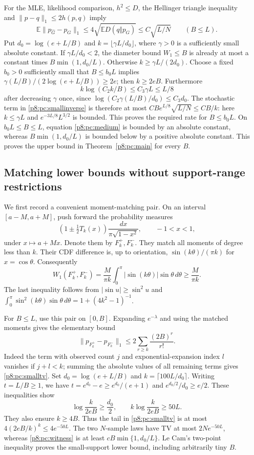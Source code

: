 \documentclass[11pt,a4paper]{article}
\theoremstyle{definition}
\theoremstyle{remark}
\numberwithin{equation}{section}
\begin{document}
For the MLE, likelihood comparison, $h^2\le D$, the Hellinger
triangle inequality and $\|p-q\|_1\le2h(p,q)$ imply
\[
 \mathbb E\|p_{\widehat G}-p_G\|_1
              \le4\sqrt{\mathbb E D(q\Vert p_G)}
              \le C\sqrt{L/N}\qquad(B\le L).
\]
Put $d_0=\log(e+L/B)$ and $k=\lfloor\gamma L/d_0\rfloor$,
where $\gamma>0$ is a sufficiently small absolute constant.
If $\gamma L/d_0<2$, the diameter bound $W_1\le B$ is already at
most a constant times $B\min(1,d_0/L)$.  Otherwise
$k\ge\gamma L/(2d_0)$.  Choose a fixed $b_0>0$ sufficiently small
that $B\le b_0L$ implies
$\gamma(L/B)/(2\log(e+L/B))\ge2e$; then $k\ge2eB$.
Furthermore
\[
 k\log(C_2k/B)\le C_3\gamma L\le L/8
\]
after decreasing $\gamma$ once, since
$\log(C_2\gamma(L/B)/d_0)\le C_3d_0$.
The stochastic term in \eqref{p8:pc:smallinverse} is therefore at most
$CB e^{L/8}\sqrt{L/N}\le CB/k$: here $k\le\gamma L$ and
$e^{-3L/8}L^{3/2}$ is bounded.  This proves the required rate for
$B\le b_0L$.  On $b_0L\le B\le L$, equation \eqref{p8:pc:medium}
is bounded by an absolute constant, whereas
$B\min(1,d_0/L)$ is bounded below by a positive absolute constant.
This proves the upper bound in Theorem~\ref{p8:pc:main} for every $B$.

\subsection{Matching lower bounds without support-range restrictions}

We first record a convenient moment-matching pair.  On an interval
$[a-M,a+M]$, push forward the probability measures
\[
 (1\pm\tfrac12T_k(x))\frac{dx}{\pi\sqrt{1-x^2}},\qquad -1<x<1,
\]
under $x\mapsto a+Mx$.  Denote them by $F_k^+,F_k^-$.
They match all moments of degree less than $k$.  Their CDF difference
is, up to orientation, $\sin(k\theta)/(\pi k)$ for $x=\cos\theta$.
Consequently
\begin{equation}\label{p8:pc:witness}
 W_1(F_k^+,F_k^-)
   =\frac M{\pi k}\int_0^\pi|\sin(k\theta)|\sin\theta\,d\theta
   \ge\frac M{\pi k}.
\end{equation}
The last inequality follows from $|\sin u|\ge\sin^2u$ and
$\int_0^\pi\sin^2(k\theta)\sin\theta\,d\theta
=1+(4k^2-1)^{-1}$.

For $B\le L$, use this pair on $[0,B]$.  Expanding $e^{-\lambda}$
and using the matched moments gives the elementary bound
\begin{equation}\label{p8:pc:smalltv}
 \|p_{F_k^+}-p_{F_k^-}\|_1
 \le2\sum_{r\ge k}\frac{(2B)^r}{r!}.
\end{equation}
Indeed the term with observed count $j$ and exponential-expansion
index $l$ vanishes if $j+l<k$; summing the absolute values of all
remaining terms gives \eqref{p8:pc:smalltv}.
Set $d_0=\log(e+L/B)$ and $k=\lceil100L/d_0\rceil$.
Writing $t=L/B\ge1$, we have
$t=e^{d_0}-e\ge e^{d_0}/(e+1)$ and
$e^{d_0/2}/d_0\ge e/2$.  These inequalities show
\[
 \log\frac{k}{2eB}\ge\frac{d_0}2,
 \qquad k\log\frac{k}{2eB}\ge50L.
\]
They also ensure $k\ge4B$.  Thus the tail in
\eqref{p8:pc:smalltv} is at most $4(2eB/k)^k\le4e^{-50L}$.
The two $N$-sample laws have TV at most $2Ne^{-50L}$, whereas
\eqref{p8:pc:witness} is at least
$cB\min\{1,d_0/L\}$.  Le Cam's two-point inequality proves the
small-support lower bound, including arbitrarily tiny $B$.
\end{document}
